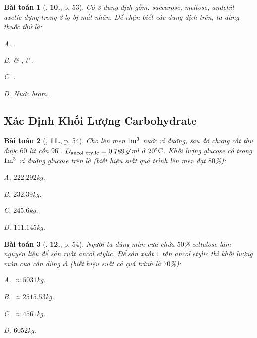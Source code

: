 \documentclass{article}
\numberwithin{equation}{section}
\newtheorem{baitoan}{Bài toán}[section]
\begin{document}
\begin{baitoan}[\cite{An2008}, \textbf{10.}, p. 53]
	Có 3 dung dịch gồm: saccarose, maltose, anđehit axetic đựng trong 3 lọ bị mất nhãn. Để nhận biết các dung dịch trên, ta dùng thuốc thử là:
	\begin{enumerate*}
		\item[{\rm\sf A.}] \emph{}.
		\item[{\rm\sf B.}] \emph{} \& \emph{}, $t^\circ$.
		\item[{\rm\sf C.}] \emph{}.
		\item[{\rm\sf D.}] Nước brom.
	\end{enumerate*}
\end{baitoan}

\subsection{Xác Định Khối Lượng Carbohydrate}

\begin{baitoan}[\cite{An2008}, \textbf{11.}, p. 54]
	Cho lên men $\rm1m^3$ nước rỉ đường, sau đó chưng cất thu được $60$ lít cồn $96^\circ$. $D_{\rm ancol\ etylic} = 0.789$\emph{g\texttt{/}ml} ở $\rm20^\circ C$. Khối lượng glucose có trong $\rm1m^3$ rỉ đường glucose trên là (biết hiệu suất quá trình lên men đạt $80$\%):
	\begin{enumerate*}
		\item[{\rm\sf A.}] $222.292$\emph{kg}.
		\item[{\rm\sf B.}] $232.39$\emph{kg}.
		\item[{\rm\sf C.}] $245.6$\emph{kg}.
		\item[{\rm\sf D.}] $111.145$\emph{kg}.
	\end{enumerate*}
\end{baitoan}

\begin{baitoan}[\cite{An2008}, \textbf{12.}, p. 54]
	Người ta dùng mùn cưa chứa $50$\% cellulose làm nguyên liệu để sản xuất ancol etylic. Để sản xuất $1$ tấn ancol etylic thì khối lượng mùn cưa cần dùng là (biết hiệu suất cả quá trình là $70$\%):
	\begin{enumerate*}
		\item[{\rm\sf A.}] $\approx5031$\emph{kg}.
		\item[{\rm\sf B.}] $\approx2515.53$\emph{kg}.
		\item[{\rm\sf C.}] $\approx4561$\emph{kg}.
		\item[{\rm\sf D.}] $6052$\emph{kg}.
	\end{enumerate*}
\end{baitoan}
\end{document}
